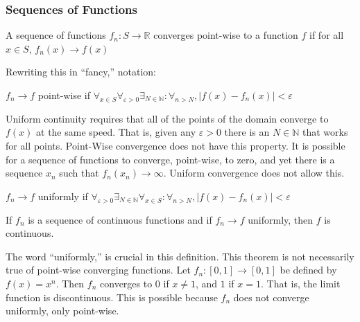 \documentclass[crop=false,class=article,oneside]{standalone}
\begin{document}
        \subsubsection{Sequences of Functions}
            \begin{definition}
                A sequence of functions
                $f_{n}:S\rightarrow\mathbb{R}$ converges
                point-wise to a function $f$ if
                for all $x\in{S}$, $f_{n}(x)\rightarrow{f(x)}$
            \end{definition}
            Rewriting this in ``fancy,'' notation:
            \begin{definition}
                $f_{n}\rightarrow{f}$ point-wise if
                $\forall_{x\in{S}}\forall_{\varepsilon>0}%
                 \exists_{N\in\mathbb{N}}:\forall_{n>N},%
                 |f(x)-f_{n}(x)|<\varepsilon$
            \end{definition}
            Uniform continuity requires that all of the
            points of the domain converge to $f(x)$ at
            the same speed. That is, given any $\varepsilon>0$
            there is an $N\in\mathbb{N}$ that works for
            all points. Point-Wise convergence does not
            have this property. It is possible for a sequence
            of functions to converge, point-wise, to zero,
            and yet there is a sequence $x_{n}$ such that
            $f_{n}(x_{n})\rightarrow\infty$. Uniform
            convergence does not allow this.
            \begin{definition}
                $f_{n}\rightarrow{f}$ uniformly if
                $\forall_{\varepsilon>0}%
                 \exists_{N\in\mathbb{N}}%
                 \forall_{x\in{S}}:\forall_{n>N},%
                 |f(x)-f_{n}(x)|<\varepsilon$
            \end{definition}
            \begin{theorem}
                If $f_{n}$ is a sequence of
                continuous functions and if
                $f_{n}\rightarrow{f}$ uniformly, then
                $f$ is continuous.
            \end{theorem}
            The word ``uniformly,'' is crucial in
            this definition. This theorem is not
            necessarily true of point-wise converging
            functions. Let
            $f_{n}:[0,1]\rightarrow[0,1]$ be defined by
            $f(x)=x^{n}$. Then $f_{n}$ converges to
            $0$ if $x\ne{1}$, and $1$ if $x=1$. That is,
            the limit function is discontinuous. This is
            possible because $f_{n}$ does not
            converge uniformly, only point-wise.
\end{document}
